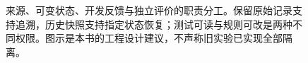 \begin{figure}[htbp]
\centering

\caption{来源、可变状态、开发反馈与独立评价的职责分工。保留原始记录支持追溯，历史快照支持指定状态恢复；测试可读与规则可改是两种不同权限。图示是本书的工程设计建议，不声称旧实验已实现全部隔离。}
\label{fig:ch14-rail}
\end{figure}
